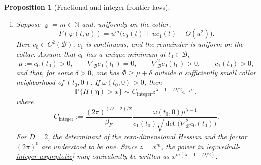 \documentclass[11pt]{amsart}
\numberwithin{equation}{section}
\newtheorem{proposition}[theorem]{Proposition}
\theoremstyle{definition}
\theoremstyle{remark}
\begin{document}
\begin{proposition}[Fractional and integer frontier laws]
\begin{enumerate}[(i)]
\item Suppose $\varrho=m\in\mathbb N$ and, uniformly on the collar,
\begin{equation}\label{eq:weibull-integer-phase}
 F(\varphi(t,u))
 =u^m\bigl(c_0(t)+u c_1(t)+O(u^2)\bigr).
\end{equation}
Here $c_0\in C^2(\mathcal B)$, $c_1$ is continuous, and the remainder is
uniform on the collar.  Assume that $c_0$ has a unique minimum at
$t_0\in\mathcal B$,
\begin{equation}\label{eq:weibull-integer-nondegeneracy}
 \mu:=c_0(t_0)>0,
 \qquad
 \nabla_{\mathcal B}c_0(t_0)=0,
 \qquad
 \nabla_{\mathcal B}^2c_0(t_0)>0,
 \qquad
 c_1(t_0)>0,
\end{equation}
and that, for some $\delta>0$, one has $\Phi\ge\mu+\delta$ outside a
sufficiently small collar neighborhood of $(t_0,0)$.  If $\omega(t_0,0)>0$, then
\begin{equation}\label{eq:weibull-integer-asymptotic}
 \mathbb P\{H(\bm\eta)>x\}
 \sim C_{\mathrm{integer}}
 z^{\lambda-1-D/2}e^{-\mu z},
\end{equation}
where
\begin{equation}\label{eq:weibull-integer-constant}
 C_{\mathrm{integer}}
 :=\frac{(2\pi)^{(D-2)/2}}{\beta_F}
 \frac{
   \omega(t_0,0)\mu^{\lambda-1}
 }{
   c_1(t_0)
   \sqrt{\det\bigl(\nabla_{\mathcal B}^2c_0(t_0)\bigr)}
 }.
\end{equation}
For $D=2$, the determinant of the zero-dimensional Hessian and the factor
$(2\pi)^0$ are understood to be one.  Since $z=x^m$, the power in
\eqref{eq:weibull-integer-asymptotic} may equivalently be written as
$x^{m(\lambda-1-D/2)}$.
\end{enumerate}
\end{proposition}
\end{document}

